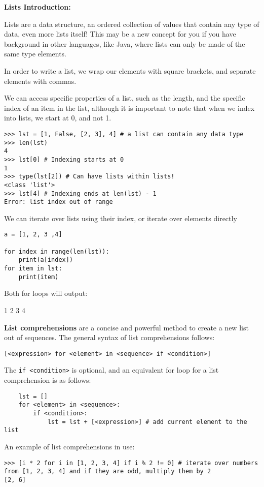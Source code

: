 \textbf{Lists Introduction:}

Lists are a data structure, an ordered collection of values that contain any type of data, even more lists itself!
This may be a new concept for you if you have background in other languages, like Java, where lists can only be made of the same type elements.

In order to write a list, we wrap our elements with square brackets, and separate elements with commas.

We can access specific properties of a list, such as the length, 
and the specific index of an item in the list, although it is important to note that
when we index into lists, we start at 0, and not 1.

\begin{lstlisting}
>>> lst = [1, False, [2, 3], 4] # a list can contain any data type
>>> len(lst)
4
>>> lst[0] # Indexing starts at 0
1
>>> type(lst[2]) # Can have lists within lists!
<class 'list'>
>>> lst[4] # Indexing ends at len(lst) - 1
Error: list index out of range
\end{lstlisting}

We can iterate over lists using their index, or iterate over elements directly

\begin{lstlisting}
a = [1, 2, 3 ,4]

for index in range(len(lst)):
	print(a[index])
for item in lst:
	print(item)
\end{lstlisting}

Both for loops will output:

1
2
3
4

\textbf{List comprehensions} are a concise and powerful method to create a new list out of sequences. The general syntax of list comprehensions follows:
\begin{lstlisting}
[<expression> for <element> in <sequence> if <condition>]
\end{lstlisting}

The \lstinline{if <condition>} is optional, and an equivalent for loop for a list comprehension is as follows:
\begin{lstlisting}
	lst = []
	for <element> in <sequence>:
		if <condition>:
			lst = lst + [<expression>] # add current element to the list
\end{lstlisting}

An example of list comprehensions in use:

\begin{lstlisting}
>>> [i * 2 for i in [1, 2, 3, 4] if i % 2 != 0] # iterate over numbers from [1, 2, 3, 4] and if they are odd, multiply them by 2
[2, 6]
\end{lstlisting}

